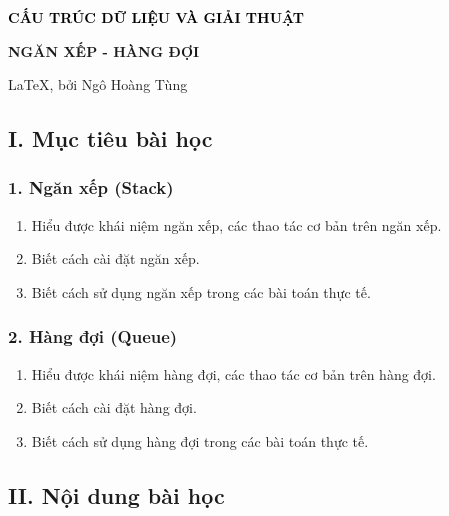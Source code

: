 
\begin{center}
    \textbf{\textcolor{black}{\large\LARGE CẤU TRÚC DỮ LIỆU VÀ GIẢI THUẬT}}

    \textbf{\large  NGĂN XẾP - HÀNG ĐỢI}

    \large\LaTeX, bởi Ngô Hoàng Tùng
\end{center}


\subsection*{I. Mục tiêu bài học}
\subsubsection*{1. Ngăn xếp (Stack)}
\begin{enumerate}[label=\alph*.]
    \item Hiểu được khái niệm ngăn xếp, các thao tác cơ bản trên ngăn xếp.
    \item Biết cách cài đặt ngăn xếp.
    \item Biết cách sử dụng ngăn xếp trong các bài toán thực tế.
\end{enumerate}
\subsubsection*{2. Hàng đợi (Queue)}
\begin{enumerate}[label=\alph*.]
    \item Hiểu được khái niệm hàng đợi, các thao tác cơ bản trên hàng đợi.
    \item Biết cách cài đặt hàng đợi.
    \item Biết cách sử dụng hàng đợi trong các bài toán thực tế.
\end{enumerate}

\subsection*{II. Nội dung bài học}

